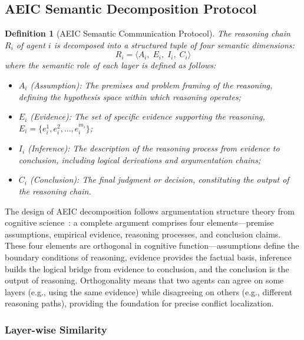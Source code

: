 \documentclass[12pt,a4paper]{article}
\newtheorem{definition}{Definition}[section]
\begin{document}
\subsection{AEIC Semantic Decomposition Protocol}\label{sec:aeic}

\begin{definition}[AEIC Semantic Communication Protocol]
The reasoning chain $R_i$ of agent $i$ is decomposed into a structured tuple of four semantic dimensions:
\begin{equation}
R_i = \langle A_i,\; E_i,\; I_i,\; C_i \rangle
\end{equation}
where the semantic role of each layer is defined as follows:
\begin{itemize}[nosep]
    \item $A_i$ (Assumption): The premises and problem framing of the reasoning, defining the hypothesis space within which reasoning operates;
    \item $E_i$ (Evidence): The set of specific evidence supporting the reasoning, $E_i = \{e_i^1, e_i^2, \ldots, e_i^{m_i}\}$;
    \item $I_i$ (Inference): The description of the reasoning process from evidence to conclusion, including logical derivations and argumentation chains;
    \item $C_i$ (Conclusion): The final judgment or decision, constituting the output of the reasoning chain.
\end{itemize}
\end{definition}

The design of AEIC decomposition follows argumentation structure theory from cognitive science~\cite{fudenberg1991game}: a complete argument comprises four elements---premise assumptions, empirical evidence, reasoning processes, and conclusion claims. These four elements are orthogonal in cognitive function---assumptions define the boundary conditions of reasoning, evidence provides the factual basis, inference builds the logical bridge from evidence to conclusion, and the conclusion is the output of reasoning. Orthogonality means that two agents can agree on some layers (e.g., using the same evidence) while disagreeing on others (e.g., different reasoning paths), providing the foundation for precise conflict localization.

\subsubsection{Layer-wise Similarity}
\end{document}
